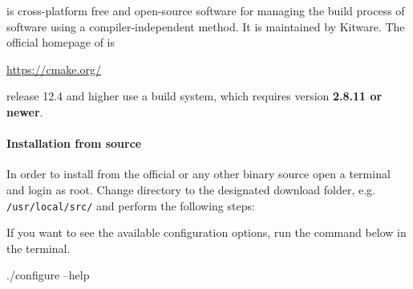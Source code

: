 % 
%               
%          
% 

\levelstay{\texorpdfstring{\protect\marktool{\cmakename}}{\cmakename{}}}

\marktool{\cmakename} is cross-platform free and open-source software for managing the build process of software using a compiler-independent method. It is maintained by Kitware. The official homepage of is \marktool{\cmakename}

\href{https://cmake.org/}{https://cmake.org/}

\marktool{\trilinosname} release 12.4 and higher use a \marktool{\cmakename} build system, which requires \marktool{\cmakename} version \textbf{2.8.11 or newer}.

\paragraph{Installation from source}

In order to install \marktool{\cmakename} from the official or any other binary source open a terminal and login as root. Change directory to the designated download folder, e.g. \verb+/usr/local/src/+ and perform the following steps:


If you want to see the available configuration options, run the command below in the terminal.

\begin{code}
./configure --help
\end{code}

